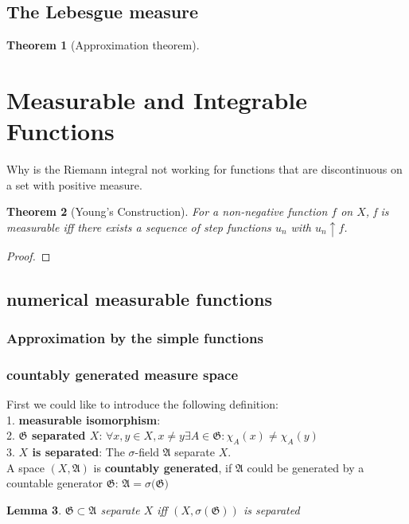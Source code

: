 \documentclass[a4paper,11pt,oneside,fleqn]{book}
\newtheorem{theorem}{Theorem}[section]
\newtheorem{lemma}[theorem]{Lemma}
\theoremstyle{definition}
\theoremstyle{remark}
\begin{document}
\subsection{The Lebesgue measure}
\begin{theorem}[Approximation theorem]
\end{theorem}



\section{Measurable and Integrable Functions}
Why is the Riemann integral not working for functions that are discontinuous on a set with positive measure.

\begin{theorem}[Young's Construction]
	For a non-negative function $f$ on $X$, f is measurable iff there exists a sequence of step functions $u_n$ with $u_n \uparrow f$. 
\end{theorem}
\begin{proof}
\end{proof}


\subsection*{numerical measurable functions}
\subsubsection*{Approximation by the simple functions}


\subsubsection*{countably generated measure space} 
First we could like to introduce the following definition:\\
1. \textbf{measurable isomorphism}:  \\
2. \textbf{$\mathfrak{G}$ separated $X$}: $\forall x, y \in X, x\neq y \exists A \in \mathfrak{G}: \chi_A(x) \neq \chi_A(y)$    \\
3. \textbf{$X$ is separated}: The $\sigma$-field $\mathfrak{A}$ separate $X$.\\
A space $(X, \mathfrak{A})$ is \textbf{countably generated}, if $\mathfrak{A}$ could be generated by a countable generator $\mathfrak{G}$: $\mathfrak{A} = \sigma{(\mathfrak{G}})$

\begin{lemma}
	$\mathfrak{G} \subset \mathfrak{A}$ separate $X$ iff $(X, \sigma(\mathfrak{G}))$ is separated
\end{lemma}
\end{document}

